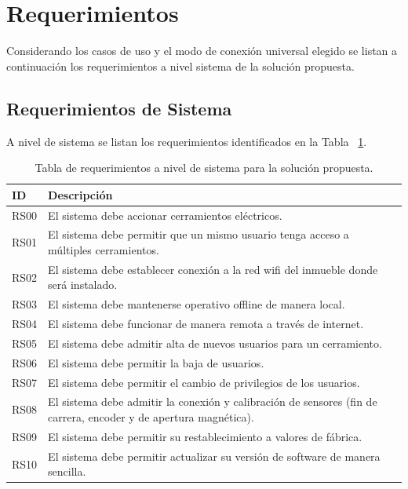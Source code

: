 \section{Requerimientos}
Considerando los casos de uso y el modo de conexión universal elegido se listan a continuación los requerimientos a nivel sistema de la solución propuesta.
\subsection{Requerimientos de Sistema}
A nivel de sistema se listan los requerimientos identificados en la Tabla ~\ref{table:req_sistemas}.
\begin{table}[ht]
	\begin{tabular}{|l|m{12cm}|}
		\hline
		\textbf{ID} & \textbf{Descripción}                                                                                             \\ \hline
		RS00        & El sistema debe accionar cerramientos eléctricos.                                                                \\ \hline
		RS01        & El sistema debe permitir que un mismo usuario tenga acceso a múltiples cerramientos.                             \\ \hline
		RS02        & El sistema debe establecer conexión a la red wifi del inmueble donde será instalado.                             \\ \hline
		RS03        & El sistema debe mantenerse operativo offline de manera local.                                                    \\ \hline
		RS04        & El sistema debe funcionar de manera remota a través de internet.                                                 \\ \hline
		RS05        & El sistema debe admitir alta de nuevos usuarios para un cerramiento.                                             \\ \hline
		RS06        & El sistema debe permitir la baja de usuarios.                                                                    \\ \hline
		RS07        & El sistema debe permitir el cambio de privilegios de los usuarios.                                               \\ \hline
		RS08        & El sistema debe admitir la conexión y calibración de sensores (fin de carrera, encoder y de apertura magnética). \\ \hline
		RS09        & El sistema debe permitir su restablecimiento a valores de fábrica.                                               \\ \hline
		RS10        & El sistema debe permitir actualizar su versión de software de manera sencilla.                                   \\ \hline
	\end{tabular}
	\caption[Requerimientos de Sistema]{Tabla de requerimientos a nivel de sistema para la solución propuesta.}
	\label{table:req_sistemas}
\end{table}

